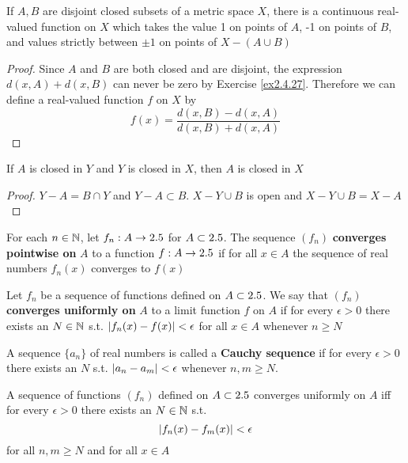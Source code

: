 \documentclass[11pt]{article}
\begin{document}
\begin{lemma}[]
\label{lemma2.14}
If \(A,B\) are disjoint closed subsets of a metric space \(X\), there is a
continuous real-valued function on \(X\) which takes the value 1 on points of
\(A\), -1 on points of \(B\), and values strictly between \(\pm1\) on points
of \(X-(A\cup B)\)
\end{lemma}

\begin{proof}
Since \(A\) and \(B\) are both closed and are disjoint, the expression
\(d(x,A)+d(x,B)\) can never be zero by Exercise \ref{ex2.4.27}. Therefore we
can define a real-valued function \(f\) on \(X\) by
\begin{equation*}
f(x)=\frac{d(x,B)-d(x,A)}{d(x,B)+d(x,A)}
\end{equation*}
\end{proof}

\begin{lemma}[]
If \(A\)  is closed in \(Y\) and \(Y\) is closed in \(X\), then \(A\) is
closed in \(X\)
\end{lemma}

\begin{proof}
\(Y-A=B\cap Y\) and \(Y-A\subset B\). \(X-Y\cup B\) is open and \(X-Y\cup B=X-A\)
\end{proof}

\begin{definition}[]
For each \(n\in\mathbb{N}\), let \(f_n:A\to2.5\) for \(A\subset2.5\). The sequence
\((f_n)\) \textbf{converges pointwise on} \(A\) to a function \(f:A\to2.5\) if for all
\(x\in A\) the sequence of real numbers \(f_n(x)\) converges to \(f(x)\)
\end{definition}

\begin{definition}[]
Let \(f_n\) be a sequence of functions defined on \(A\subset2.5\). We say that
\((f_n)\) \textbf{converges uniformly on} \(A\) to a limit function \(f\) on \(A\) if
for every \(\epsilon>0\) there exists an \(N\in\mathbb{N}\) s.t.
\(\abs{f_n(x)-f(x)}<\epsilon\) for all \(x\in A\) whenever \(n\ge N\)
\end{definition}

\begin{definition}[]
A sequence \(\{a_n\}\) of real numbers is called a \textbf{Cauchy sequence} if for
every \(\epsilon>0\) there exists an \(N\) s.t. \(\abs{a_n-a_m}<\epsilon\) whenever
\(n,m\ge N\).
\end{definition}


\begin{theorem}
A sequence of functions \((f_n)\) defined on \(A\subset2.5\) converges
uniformly on \(A\) iff for every \(\epsilon>0\) there exists an \(N\in\mathbb{N}\) s.t.
\begin{equation*}
\abs{f_n(x)-f_m(x)}<\epsilon
\end{equation*}
for all \(n,m\ge N\) and for all \(x\in A\)
\end{theorem}
\end{document}
